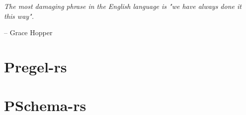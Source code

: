 \epigraph{\textit{The most damaging phrase in the English language is "we have always done it this way".}}{-- \textup{Grace Hopper}}

\section{Pregel-rs}

\section{PSchema-rs}